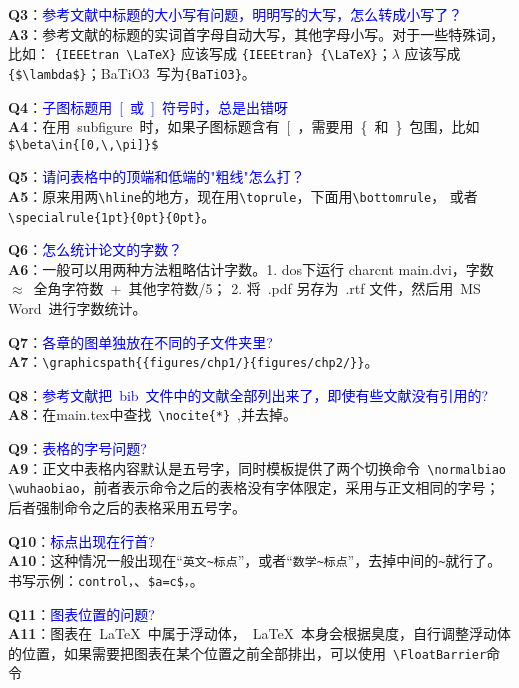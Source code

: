 \noindent \textbf{Q3}：\textcolor{blue}{参考文献中标题的大小写有问题，明明写的大写，怎么转成小写了？}\\
\textbf{A3}：参考文献的标题的实词首字母自动大写，其他字母小写。对于一些特殊词，比如：
\verb+{IEEEtran \LaTeX}+ 应该写成 \verb+{IEEEtran} {\LaTeX}+；$\lambda$ 应该写成
\verb+{$\lambda$}+；BaTiO3~写为\verb+{BaTiO3}+。

\noindent \textbf{Q4}：\textcolor{blue}{子图标题用~[~或~]~符号时，总是出错呀}\\
\textbf{A4}：在用~subfigure~时，如果子图标题含有~[~，需要用~\{~和~\}~包围，比如
\verb+$\beta\in{[0,\,\pi]}$+

\noindent \textbf{Q5}：\textcolor{blue}{请问表格中的顶端和低端的"粗线"怎么打？}\\
\textbf{A5}：原来用两\verb+\hline+的地方，现在用\verb+\toprule+，下面用\verb+\bottomrule+，
或者\verb+\specialrule{1pt}{0pt}{0pt}+。

\noindent \textbf{Q6}：\textcolor{blue}{怎么统计论文的字数？}\\
\textbf{A6}：一般可以用两种方法粗略估计字数。1. dos下运行 charcnt main.dvi，字数~$\approx$~全角字符数~+~其他字符数/5；
2. 将~.pdf 另存为~.rtf 文件，然后用~MS Word~进行字数统计。

\noindent \textbf{Q7}：\textcolor{blue}{各章的图单独放在不同的子文件夹里?}\\
\textbf{A7}：\verb+\graphicspath{{figures/chp1/}{figures/chp2/}}+。

\noindent \textbf{Q8}：\textcolor{blue}{参考文献把~bib~文件中的文献全部列出来了，即使有些文献没有引用的?}\\
\textbf{A8}：在main.tex中查找~\verb+\nocite{*}+~,并去掉。

\noindent \textbf{Q9}：\textcolor{blue}{表格的字号问题?}\\
\textbf{A9}：正文中表格内容默认是五号字，同时模板提供了两个切换命令~\verb+\normalbiao \wuhaobiao+，前者表示命令之后的表格没有字体限定，采用与正文相同的字号；后者强制命令之后的表格采用五号字。

\noindent \textbf{Q10}：\textcolor{blue}{标点出现在行首?}\\
\textbf{A10}：这种情况一般出现在“\verb+英文~标点+”，或者“\verb+数学~标点+”，去掉中间的\verb+~+就行了。书写示例：\verb+control，+、\verb+$a=c$，+。

\noindent \textbf{Q11}：\textcolor{blue}{图表位置的问题?}\\
\textbf{A11}：图表在~\LaTeX~中属于浮动体，~\LaTeX~本身会根据臭度，自行调整浮动体的位置，如果需要把图表在某个位置之前全部排出，可以使用~\verb+\FloatBarrier+命令


